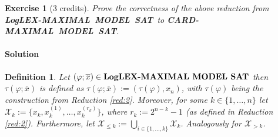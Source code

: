 \documentclass [11pt]{article}
\newcommand{\MAXCARDSAT}{\mbox{\bf CARD-MAXIMAL MODEL SAT}}
\newcommand{\MAXLEXSAT}{\mbox{\bf LEX-MAXIMAL MODEL SAT}}
\newcommand{\LogMAXLEXSAT}{\mbox{\bf LogLEX-MAXIMAL MODEL SAT}}
\newcommand{\nmodels}{\not\models}
\newtheorem{definition}[theorem]{Definition}
\newtheorem{exercise}[theorem]{Exercise}
\begin{document}



\newpage







\begin{exercise}[3 credits]
{\em 
Prove the correctness of the above reduction
from \\
\LogMAXLEXSAT\ to 
\MAXCARDSAT.
}%
\end{exercise}


\paragraph*{Solution}
\begin{definition}
Let $(\varphi;\overline{x}) \in \LogMAXLEXSAT$ then $\tau(\varphi;\overline{x})$ is defined as $\tau(\varphi;\overline{x}):= (\tau(\varphi), x_n)$, with $\tau(\varphi)$ being the construction from Reduction \ref{red:2}. Moreover, for some $k \in \{1, \dots , n\}$ let $\mathcal{X}_k:=\{ x_k, x_k^{(1)}, \dots, x_k^{(r_k)}\}$, where $r_k:=2^{n-k}-1$ (as defined in Reduction \ref{red:2}). Furthermore, let $\mathcal{X}_{\leq k}:= \bigcup_{i \in \{1, \dots, k\}} \mathcal{X}_k$. Analogously for $\mathcal{X}_{> k}$.
\end{definition}
\end{document}
